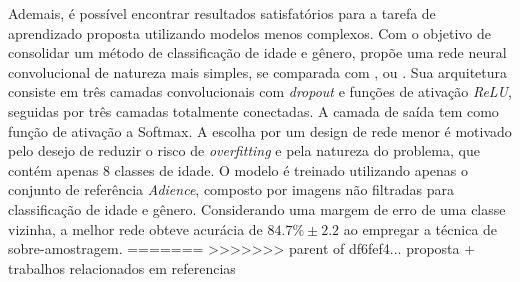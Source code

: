 Ademais, é possível encontrar resultados satisfatórios para a tarefa de aprendizado proposta utilizando modelos menos complexos. Com o objetivo de consolidar um método de classificação de idade e gênero, \cite{levi2015age} propõe uma rede neural convolucional de natureza mais simples, se comparada com \cite{inception}, \cite{vggnet} ou \cite{resnet}. Sua arquitetura consiste em três camadas convolucionais com \emph{dropout} e funções de ativação \emph{ReLU}, seguidas por três camadas totalmente conectadas. A camada de saída tem como função de ativação a Softmax. A escolha por um design de rede menor é motivado pelo desejo de reduzir o risco de \emph{overfitting} e pela natureza do problema, que contém apenas 8 classes de idade. O modelo é treinado utilizando apenas o conjunto de referência \emph{Adience}, composto por imagens não filtradas para classificação de idade e gênero. Considerando uma margem de erro de uma classe vizinha, a melhor rede obteve acurácia de $84.7\% \pm 2.2$ ao empregar a técnica de sobre-amostragem.
=======
>>>>>>> parent of df6fef4... proposta + trabalhos relacionados em referencias
